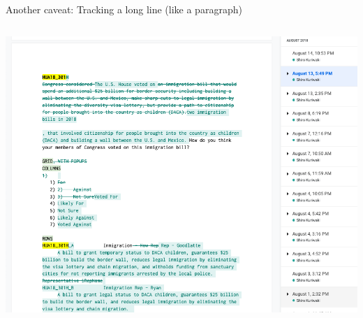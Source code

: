\documentclass[ignorenonframetext, 10pt, aspectratio=169]{beamer}
\begin{document}
\begin{frame}{Another caveat: Tracking a long line (like a paragraph)}
\begin{columns}[T]
\begin{column}{0.6\textwidth}
\begin{overprint}
\includegraphics[width = \linewidth]{googledoc-diff.png}
\end{overprint}
\end{column}
\end{columns}
\end{frame}
\end{document}
